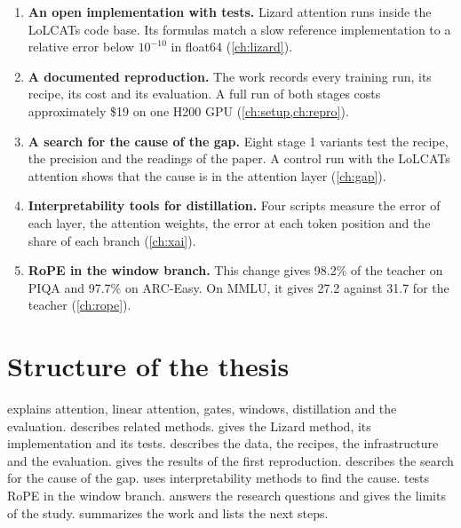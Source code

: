 \begin{enumerate}
\item \textbf{An open implementation with tests.} Lizard attention runs inside the LoLCATs code base. Its formulas match a slow reference implementation to a relative error below $10^{-10}$ in float64 (\cref{ch:lizard}).
\item \textbf{A documented reproduction.} The work records every training run, its recipe, its cost and its evaluation. A full run of both stages costs approximately \$19 on one H200 GPU (\cref{ch:setup,ch:repro}).
\item \textbf{A search for the cause of the gap.} Eight stage 1 variants test the recipe, the precision and the readings of the paper. A control run with the LoLCATs attention shows that the cause is in the attention layer (\cref{ch:gap}).
\item \textbf{Interpretability tools for distillation.} Four scripts measure the error of each layer, the attention weights, the error at each token position and the share of each branch (\cref{ch:xai}).
\item \textbf{RoPE in the window branch.} This change gives 98.2\% of the teacher on PIQA and 97.7\% on ARC-Easy. On MMLU, it gives 27.2 against 31.7 for the teacher (\cref{ch:rope}).
\end{enumerate}

\section{Structure of the thesis}
\label{sec:structure}

 explains attention, linear attention, gates, windows, distillation and the evaluation.  describes related methods.  gives the Lizard method, its implementation and its tests.  describes the data, the recipes, the infrastructure and the evaluation.  gives the results of the first reproduction.  describes the search for the cause of the gap.  uses interpretability methods to find the cause.  tests RoPE in the window branch.  answers the research questions and gives the limits of the study.  summarizes the work and lists the next steps.
